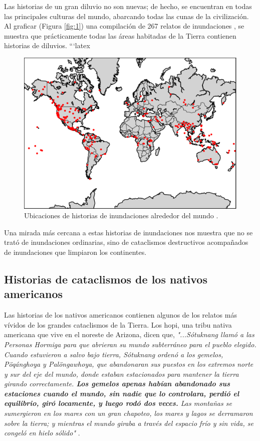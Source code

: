 \documentclass[10pt,twocolumn,letterpaper]{article}
\begin{document}
Las historias de un gran diluvio no son nuevas; de hecho, se encuentran en todas las principales culturas del mundo, abarcando todas las cunas de la civilización. Al graficar (Figura \ref{fig:1}) una compilación de 267 relatos de inundaciones \cite{3}, se muestra que prácticamente todas las áreas habitadas de la Tierra contienen historias de diluvios.
```latex
\begin{figure}[h]
\begin{center}
   \includegraphics[width=1\linewidth]{b.png}
\end{center}
   \caption{Ubicaciones de historias de inundaciones alrededor del mundo \cite{3}.}
\label{fig:1}
\label{fig:onecol}
\end{figure}

Una mirada más cercana a estas historias de inundaciones nos muestra que no se trató de inundaciones ordinarias, sino de cataclismos destructivos acompañados de inundaciones que limpiaron los continentes.

\subsection{Historias de cataclismos de los nativos americanos}

Las historias de los nativos americanos contienen algunos de los relatos más vívidos de los grandes cataclismos de la Tierra. Los hopi, una tribu nativa americana que vive en el noreste de Arizona, dicen que, \textit{"...Sótuknang llamó a las Personas Hormiga para que abrieran su mundo subterráneo para el pueblo elegido. Cuando estuvieron a salvo bajo tierra, Sótuknang ordenó a los gemelos, Pöqánghoya y Palöngawhoya, que abandonaran sus puestos en los extremos norte y sur del eje del mundo, donde estaban estacionados para mantener la tierra girando correctamente. \textbf{Los gemelos apenas habían abandonado sus estaciones cuando el mundo, sin nadie que lo controlara, perdió el equilibrio, giró locamente, y luego rodó dos veces.} Las montañas se sumergieron en los mares con un gran chapoteo, los mares y lagos se derramaron sobre la tierra; y mientras el mundo giraba a través del espacio frío y sin vida, se congeló en hielo sólido"} \cite{4}.
\end{document}

